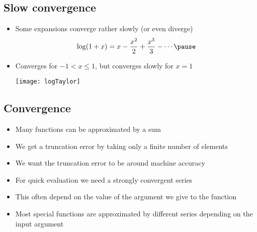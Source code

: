 
\begin{slide}
\section[-2]{Slow convergence}

\begin{PauseHighLight}
  \begin{itemize}
  \item Some expansions converge rather slowly (or even diverge)
    \begin{align*}
      \log(1+x) =  x - \frac{x^2}{2} + \frac{x^3}{3} - \cdots\pause
    \end{align*}
  \item Converges for $-1 < x \leq 1$, but converges slowly for $x=1$
    \begin{center}
      \texttt{[image: logTaylor]}\pause
    \end{center}
  \end{itemize}
\end{PauseHighLight}

\end{slide}


\begin{slide}
\section{Convergence}

\begin{PauseHighLight}
  \begin{itemize}
  \item Many functions can be approximated by a sum\pause
  \item We get a truncation error by taking only a finite number of
    elements\pause
  \item We want the truncation error to be around machine accuracy\pause
  \item For quick evaluation we need a strongly convergent series\pause
  \item This often depend on the value of the argument we give to the
    function\pause
  \item Most special functions are approximated by different series
    depending on the input argument\pause
  \end{itemize}
\end{PauseHighLight}

\end{slide}

